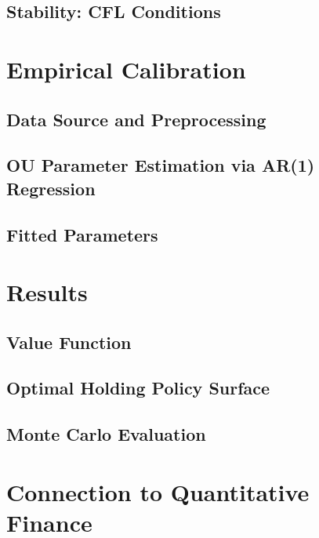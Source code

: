 \documentclass[11pt]{article}
\theoremstyle{plain}
\theoremstyle{definition}
\theoremstyle{remark}
\begin{document}
\subsection{Stability: CFL Conditions}
\label{sec:cfl}

\section{Empirical Calibration}
\label{sec:data}

\subsection{Data Source and Preprocessing}
\label{sec:datasource}

\subsection{OU Parameter Estimation via AR(1) Regression}
\label{sec:estimation}

\subsection{Fitted Parameters}
\label{sec:params}

\section{Results}
\label{sec:results}

\subsection{Value Function}
\label{sec:vf_results}

\subsection{Optimal Holding Policy Surface}
\label{sec:policy_results}

\subsection{Monte Carlo Evaluation}
\label{sec:mc_results}

\section{Connection to Quantitative Finance}
\label{sec:finance}
\end{document}
